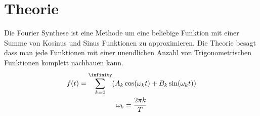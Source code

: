 \section{Theorie}
\label{sec:Theorie}
Die Fourier Synthese ist eine Methode um eine beliebige Funktion mit einer Summe von Kosinus und Sinus Funktionen zu approximieren.
Die Theorie besagt dass man jede Funktionen mit einer unendlichen Anzahl von Trigonometrischen Funktionen komplett nachbauen kann.
\begin{gather}
    f(t) = \sum_{k=0}^{\infinity} (A_k\cos(\omega_k t)+B_k\sin(\omega_k t))\\
    \omega_k = \frac{2\pi k}{T}\\
    
\end{gather}
\cite{sample}
